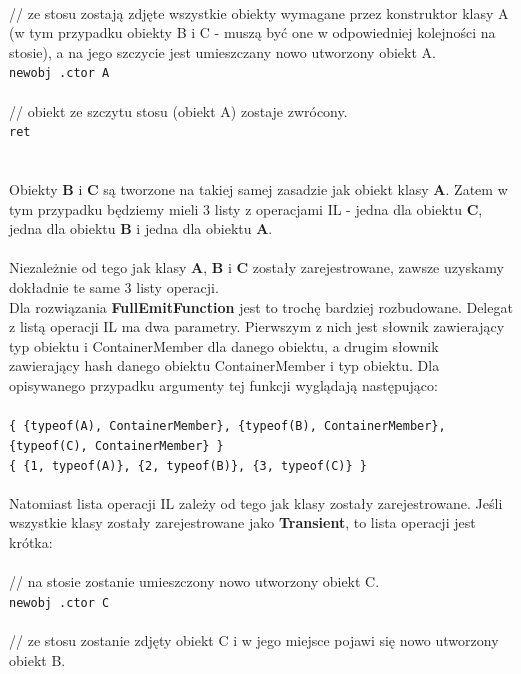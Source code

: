 \documentclass[12pt]{article}
\begin{document}
\\
// ze stosu zostają zdjęte wszystkie obiekty wymagane przez konstruktor klasy A (w tym przypadku obiekty B i C - muszą być one w odpowiedniej kolejności na stosie), a na jego szczycie jest umieszczany nowo utworzony obiekt A.\\
\texttt{newobj .ctor A}\\
\\
// obiekt ze szczytu stosu (obiekt A) zostaje zwrócony.\\
\texttt{ret} \\
\\
\\
Obiekty \textbf{B} i \textbf{C} są tworzone na takiej samej zasadzie jak obiekt klasy \textbf{A}. Zatem w tym przypadku będziemy mieli 3 listy z operacjami IL - jedna dla obiektu \textbf{C}, jedna dla obiektu \textbf{B} i jedna dla obiektu \textbf{A}.\\
\\
Niezależnie od tego jak klasy \textbf{A}, \textbf{B} i \textbf{C} zostały zarejestrowane, zawsze uzyskamy dokładnie te same 3 listy operacji.\\
\newpage
Dla rozwiązania \textbf{FullEmitFunction} jest to trochę bardziej rozbudowane. Delegat z listą operacji IL ma dwa parametry. Pierwszym z nich jest  słownik zawierający typ obiektu i ContainerMember dla danego obiektu, a drugim słownik zawierający hash danego obiektu ContainerMember i typ obiektu. Dla opisywanego przypadku argumenty tej funkcji wyglądają następująco:\\
\\
\texttt{\{ \{typeof(A), ContainerMember\}, \{typeof(B), ContainerMember\},\\
\phantom{x} \{typeof(C), ContainerMember\} \}\\
\{ \{1, typeof(A)\}, \{2, typeof(B)\}, \{3, typeof(C)\} \}}\\
\\
Natomiast lista operacji IL zależy od tego jak klasy zostały zarejestrowane. Jeśli wszystkie klasy zostały zarejestrowane jako \textbf{Transient}, to lista operacji jest krótka:\\
\\ 
// na stosie zostanie umieszczony nowo utworzony obiekt C.\\
\texttt{newobj .ctor C}\\
\\
// ze stosu zostanie zdjęty obiekt C i w jego miejsce pojawi się nowo utworzony obiekt B.\\
\end{document}
